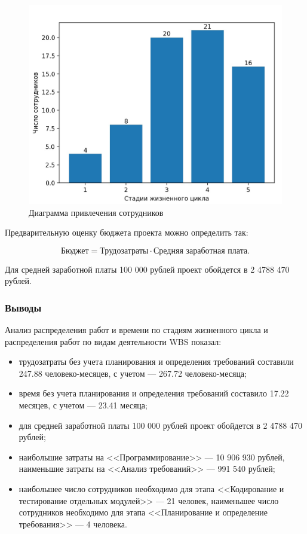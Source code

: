 \begin{figure}[H]
	\begin{center}
		\includegraphics[scale=0.22]{inc/img/task2-bar.jpg}
	\end{center}
	\captionsetup{justification=centering}
	\caption{Диаграмма привлечения сотрудников}
	\label{img:task2-bar}
\end{figure}

Предварительную оценку бюджета проекта можно определить так:

\begin{equation}
	\text{Бюджет} = \text{Трудозатраты}\cdot\text{Средняя заработная плата}.
\end{equation}

Для средней заработной платы 100 000 рублей проект обойдется в 2 4788 470 рублей.

\subsubsection*{Выводы}

Анализ распределения работ и времени по стадиям жизненного цикла и распределения работ по видам деятельности WBS показал:

\begin{itemize}
	\item трудозатраты без учета планирования и определения требований составили 247.88 человеко-месяцев, с учетом --- 267.72 человеко-месяца;
	\item время без учета планирования и определения требований составило 17.22 месяцев, с учетом --- 23.41 месяца;
	\item для средней заработной платы 100 000 рублей проект обойдется в 2 4788 470 рублей;
	\item наибольшие затраты на <<Программирование>> --- 10 906 930 рублей, наименьшие затраты на <<Анализ требований>> --- 991 540 рублей;
	\item наибольшее число сотрудников необходимо для этапа <<Кодирование и тестирование отдельных модулей>> --- 21 человек, наименьшее число сотрудников необходимо для этапа <<Планирование и определение требования>> --- 4 человека.
\end{itemize}

